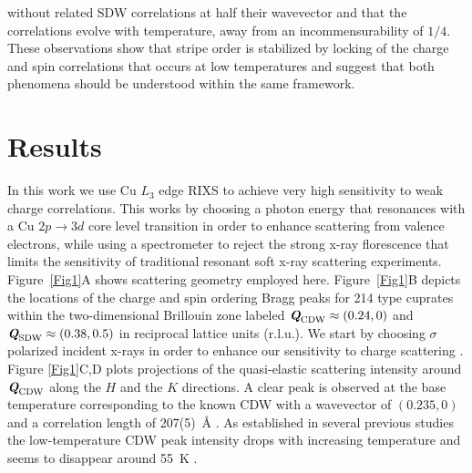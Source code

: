 \documentclass[9pt,twocolumn,twoside]{pnas-new}
\def\mathbi#1{\ensuremath{\textbf{\em #1}}}
\def\QCDW{\ensuremath{\mathbi{Q}_{\text{CDW}}}}
\def\QSDW{\ensuremath{\mathbi{Q}_{\text{SDW}}}}
\begin{document}
without related SDW correlations at half their wavevector and that the correlations evolve with temperature, away from an incommensurability of $1/4$. These observations show that stripe order is stabilized by locking of the charge and spin correlations that occurs at low temperatures and suggest that both phenomena should be understood within the same framework. 

\section*{Results}
In this work we use Cu $L_3$ edge RIXS to achieve very high sensitivity to weak charge correlations. This works by choosing a photon energy that resonances with a Cu $2p \rightarrow 3d$ core level transition in order to enhance scattering from valence electrons, while using a spectrometer to reject the strong x-ray florescence that limits the sensitivity of traditional resonant soft x-ray scattering experiments. Figure~\ref{Fig1}A shows scattering geometry employed here. Figure~\ref{Fig1}B depicts the locations of the charge and spin ordering Bragg peaks for 214 type cuprates within the two-dimensional Brillouin zone labeled $\QCDW{}\approx(0.24, 0)$ and $\QSDW{}\approx(0.38, 0.5)$ in reciprocal lattice units (r.l.u.). We start by choosing $\sigma$ polarized incident x-rays in order to enhance our sensitivity to charge scattering \cite{Ament2011, Ghiringhelli2012, Dean2015}. Figure \ref{Fig1}C,D plots projections of the quasi-elastic scattering intensity around \QCDW{} along the $H$ and the $K$ directions. A clear peak is observed at the base temperature corresponding to the known CDW with a wavevector of $(0.235, 0)$ and a correlation length of 207(5)~\AA{} \cite{ Wilkins2011, Hucker2011, Achkar2016}. As established in several previous studies the low-temperature CDW peak intensity drops with increasing temperature and seems to disappear around 55~K \cite{Wilkins2011, Hucker2011, Achkar2016}. 
\end{document}
